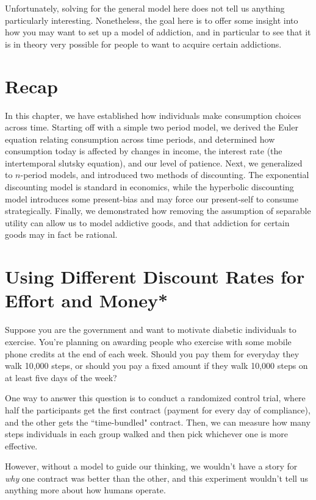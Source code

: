 Unfortunately, solving for the general model here does not tell us anything particularly interesting. Nonetheless, the goal here is to offer some insight into how you may want to set up a model of addiction, and in particular to see that it is in theory very possible for people to want to acquire certain addictions.

\section*{Recap}
In this chapter, we have established how individuals make consumption choices across time. Starting off with a simple two period model, we derived the Euler equation relating consumption across time periods, and determined how consumption today is affected by changes in income, the interest rate (the intertemporal slutsky equation), and our level of patience. Next, we generalized to $n$-period models, and introduced two methods of discounting. The exponential discounting model is standard in economics, while the hyperbolic discounting model introduces some present-bias and may force our present-self to consume strategically. Finally, we demonstrated how removing the assumption of separable utility can allow us to model addictive goods, and that addiction for certain goods may in fact be rational. 

\section{Using Different Discount Rates for Effort and Money*}\label{sec:diffdiscount}

Suppose you are the government and want to motivate diabetic individuals to exercise. You're planning on awarding people who exercise with some mobile phone credits at the end of each week. Should you pay them for everyday they walk 10,000 steps, or should you pay a fixed amount if they walk 10,000 steps on at least five days of the week? 

One way to answer this question is to conduct a randomized control trial, where half the participants get the first contract (payment for every day of compliance), and the other gets the ``time-bundled" contract. Then, we can measure how many steps individuals in each group walked and then pick whichever one is more effective.

However, without a model to guide our thinking, we wouldn't have a story for \textit{why} one contract was better than the other, and this experiment wouldn't tell us anything more about how humans operate. 

